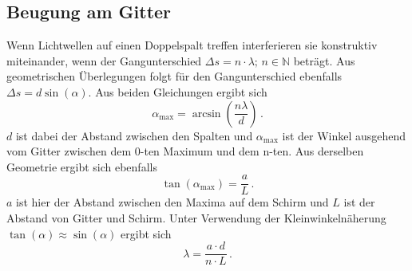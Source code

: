 \subsection{Beugung am Gitter}
Wenn Lichtwellen auf einen Doppelspalt treffen interferieren sie konstruktiv miteinander, wenn der Gangunterschied $\Delta s = n \cdot\lambda ; \, n \in \mathbb{N}$ beträgt. Aus geometrischen Überlegungen folgt für den Gangunterschied ebenfalls $\Delta s = d \sin(\alpha)$. Aus beiden Gleichungen ergibt sich 
\begin{equation*}
    \alpha_{\text{max}} = \arcsin{\left(\frac{n \lambda}{d}\right)} \, .
\end{equation*}
$d$ ist dabei der Abstand zwischen den Spalten und $\alpha_{\text{max}}$ ist der Winkel ausgehend vom Gitter zwischen dem 0-ten Maximum und dem n-ten. 
Aus derselben Geometrie ergibt sich ebenfalls 
\begin{equation*}
    \tan\left( \alpha_{\text{max}} \right) = \frac{a}{L} \, .
\end{equation*}
$a$ ist hier der Abstand zwischen den Maxima auf dem Schirm und $L$ ist der Abstand von Gitter und Schirm. Unter Verwendung der Kleinwinkelnäherung $\tan(\alpha) \approx \sin(\alpha)$ ergibt sich 
\begin{equation}
    \lambda = \frac{a \cdot d}{n \cdot L} \, . \label{eqn:Wellenlaenge_max}
\end{equation}

